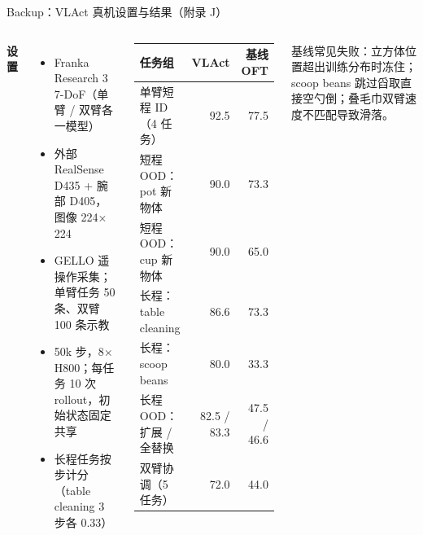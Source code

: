\documentclass[aspectratio=169,10pt]{beamer}
\begin{document}
\begin{frame}{Backup：VLAct 真机设置与结果（附录 J）}
  \begin{columns}[T]
    \textbf{设置}
    \begin{itemize}
      \item Franka Research 3 7-DoF（单臂 / 双臂各一模型）
      \item 外部 RealSense D435 + 腕部 D405，图像 224$\times$224
      \item GELLO 遥操作采集；单臂任务 50 条、双臂 100 条示教
      \item 50k 步，8$\times$H800；每任务 10 次 rollout，初始状态固定共享
      \item 长程任务按步计分（table cleaning 3 步各 0.33）
    \end{itemize}
    \begin{center}\footnotesize
    \begin{tabular}{p{3.6cm}rr}
      \toprule
      任务组 & VLAct & 基线 OFT \\
      \midrule
      单臂短程 ID（4 任务） & 92.5 & 77.5 \\
      短程 OOD：pot 新物体 & 90.0 & 73.3 \\
      短程 OOD：cup 新物体 & 90.0 & 65.0 \\
      长程：table cleaning & 86.6 & 73.3 \\
      长程：scoop beans & 80.0 & 33.3 \\
      长程 OOD：扩展 / 全替换 & 82.5 / 83.3 & 47.5 / 46.6 \\
      双臂协调（5 任务） & 72.0 & 44.0 \\
      \bottomrule
    \end{tabular}
    \end{center}
    \footnotesize 基线常见失败：立方体位置超出训练分布时冻住；scoop beans 跳过舀取直接空勺倒；叠毛巾双臂速度不匹配导致滑落。
  \end{columns}
\end{frame}
\end{document}

